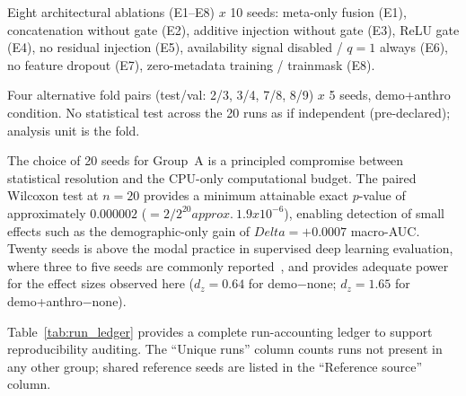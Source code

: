 \documentclass[mathematics,article,pdftex]{Definitions/mdpi}
\def\texttt#1{#1}%
\def\mathrm#1{#1}%
\def\textbf#1{#1}%
\def\Delta{Delta }%
\def\times{x}%
\def\approx{approx.\ }%
\begin{document}
{\begin{description}[leftmargin=1.5em, style=sameline, font=\normalfont]
\item[\textbf{Group E} (exploratory, 80 runs).] Eight architectural ablations (E1--E8) $\times$ 10 seeds: meta-only fusion (E1), concatenation without gate (E2), additive injection without gate (E3), ReLU gate (E4), no residual injection (E5), availability signal disabled / $q{=}1$ always (E6), no feature dropout (E7), zero-metadata training / \texttt{trainmask} (E8).
\item[\textbf{Group F} (multi-split absolute-performance check, 20 runs).] Four alternative fold pairs (test/val: 2/3, 3/4, 7/8, 8/9) $\times$ 5 seeds, \texttt{demo+anthro} condition. No statistical test across the 20 runs as if independent (pre-declared); analysis unit is the fold.
\end{description}}%

The choice of 20 seeds for Group~A is a principled compromise between statistical resolution and the CPU-only computational budget. The paired Wilcoxon test at $n{=}20$ provides a minimum attainable exact $p$-value of approximately $0.000002$ ($= 2/2^{20} \approx 1.9\times10^{-6}$), enabling detection of small effects such as the demographic-only gain of $\Delta{=}+0.0007$ macro-AUC. Twenty seeds is above the modal practice in supervised deep learning evaluation, where three to five seeds are commonly reported~\cite{Bouthillier2021,Dodge2019}, and provides adequate power for the effect sizes observed here ($d_{\mathrm{z}}{=}0.64$ for \texttt{demo}$-$\texttt{none}; $d_{\mathrm{z}}{=}1.65$ for \texttt{demo+anthro}$-$\texttt{none}).

Table~\ref{tab:run_ledger} provides a complete run-accounting ledger to support reproducibility auditing. The ``Unique runs'' column counts runs not present in any other group; shared reference seeds are listed in the ``Reference source'' column.
\end{document}
